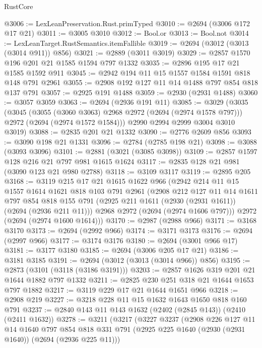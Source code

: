 \begin{lexlean}{RustCore}
\begin{coremodule}
@3006 := LexLeanPreservation.Rust.primTyped
@3010 := @2694 (@3006 @172 @17 @21)
@3011 := @3005 @3010
@3012 := Bool.or
@3013 := Bool.not
@3014 := LexLeanTarget.RustSemantics.itemFallible
@3019 := @2694 (@3012 (@3013 (@3014 @911)) @856)
@3021 := @2889 (@3011 @3019)
@3029 := @2857 @1570 @196 @201 @21 @1585 @1594 @797 @1332
@3035 := @2896 @195 @17 @21 @1585 @1592 @911
@3045 := @2942 @194 @11 @15 @1557 @1584 @1591 @818 @148 @791 @2961
@3055 := @2908 @192 @127 @11 @14 @1488 @797 @854 @818 @137 @791
@3057 := @2925 @191 @1488
@3059 := @2930 (@2931 @1488)
@3060 := @3057 @3059
@3063 := @2694 (@2936 @191 @11)
@3085 := @3029
    (@3035
      (@3045
        (@3055 (@3060 @3063) @2968 @2972 (@2694 (@2974 @1578 @797)))
        @2972
        (@2694 (@2974 @1572 @1584)))
      @2990
      @2994
      @2999
      @3004
      @3010
      @3019)
@3088 := @2835 @201 @21 @1332
@3090 := @2776 @2609 @856
@3093 := @3090 @198 @21 @1331
@3096 := @2784 (@2785 @198 @21)
@3098 := @3088 (@3093 @3096)
@3101 := @2881 (@3021 (@3085 @3098))
@3109 := @2857 @1597 @128 @216 @21 @797 @981 @1615 @1624
@3117 := @2835 @128 @21 @981 (@3090 @123 @21 @980 @2788)
@3118 := @3109 @3117
@3119 := @2895 @205
@3168 := @3119
    @215
    @17
    @21
    @1615
    @1622
    @966
    (@2942
      @214
      @11
      @15
      @1557
      @1614
      @1621
      @818
      @103
      @791
      @2961
      (@2908
        @212
        @127
        @11
        @14
        @1611
        @797
        @854
        @818
        @155
        @791
        (@2925 @211 @1611 (@2930 (@2931 @1611)) (@2694 (@2936 @211 @11)))
        @2968
        @2972
        (@2694 (@2974 @1606 @797)))
      @2972
      (@2694 (@2974 @1600 @1614)))
@3170 := @2987 (@2988 @966)
@3171 := @3168 @3170
@3173 := @2694 (@2992 @966)
@3174 := @3171 @3173
@3176 := @2694 (@2997 @966)
@3177 := @3174 @3176
@3180 := @2694 (@3001 @966 @17)
@3181 := @3177 @3180
@3185 := @2694 (@3006 @205 @17 @21)
@3186 := @3181 @3185
@3191 := @2694 (@3012 (@3013 (@3014 @966)) @856)
@3195 := @2873 (@3101 (@3118 (@3186 @3191)))
@3203 := @2857 @1626 @319 @201 @21 @1644 @1882 @797 @1332
@3211 := @2825 @230 @251 @318 @21 @1644 @1653 @797 @1882
@3217 := @3119 @229 @17 @21 @1644 @1651 @966
@3218 := @2908 @219
@3227 := @3218 @228 @11 @15 @1632 @1643 @1650 @818 @160 @791
@3237 := @2840 @143 @11 @143 @1632 (@2402 (@2845 @143)) (@2410 (@2411 @1632))
@3278 := @3211
    (@3217
      (@3227
        @3237
        (@2908
          @226
          @127
          @11
          @14
          @1640
          @797
          @854
          @818
          @331
          @791
          (@2925 @225 @1640 (@2930 (@2931 @1640)) (@2694 (@2936 @225 @11)))

\end{coremodule}
\end{lexlean}
